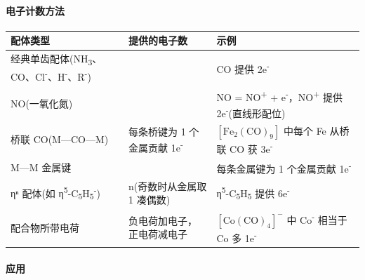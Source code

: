 \paragraph{电子计数方法}\label{ux7535ux5b50ux8ba1ux6570ux65b9ux6cd5}

{\def\LTcaptype{none} %
\begin{longtable}[]{@{}
  >{\raggedright\arraybackslash}p{}
  >{\centering\arraybackslash}p{}
  >{\raggedright\arraybackslash}p{}@{}}
\toprule\noalign{}
\begin{minipage}[b]{\linewidth}\raggedright
配体类型
\end{minipage} & \begin{minipage}[b]{\linewidth}\centering
提供的电子数
\end{minipage} & \begin{minipage}[b]{\linewidth}\raggedright
示例
\end{minipage} \\
\midrule\noalign{}
\endhead
\bottomrule\noalign{}
\endlastfoot
经典单齿配体(NH\textsubscript{3}、CO、Cl\textsuperscript{-}、H\textsuperscript{-}、R\textsuperscript{-}) & 2 & CO 提供 2e\textsuperscript{-} \\
NO(一氧化氮) & 3 & NO = NO\textsuperscript{+} + e\textsuperscript{-}，NO\textsuperscript{+} 提供 2e\textsuperscript{-}(直线形配位) \\
桥联 CO(M---CO---M) & 每条桥键为 1 个金属贡献 1e\textsuperscript{-} & \([\mathrm{Fe_2(CO)_9}]\) 中每个 Fe 从桥联 CO 获 3e\textsuperscript{-} \\
M---M 金属键 & 1 & 每条金属键为 1 个金属贡献 1e\textsuperscript{-} \\
ηⁿ 配体(如 η\textsuperscript{5}-C\textsubscript{5}H\textsubscript{5}\textsuperscript{-}) & n(奇数时从金属取 1 凑偶数) & η\textsuperscript{5}-C\textsubscript{5}H\textsubscript{5} 提供 6e\textsuperscript{-} \\
配合物所带电荷 & 负电荷加电子，正电荷减电子 & \([\mathrm{Co(CO)_4}]^-\) 中 Co\textsuperscript{-} 相当于 Co 多 1e\textsuperscript{-} \\
\end{longtable}
}

\paragraph{应用}\label{ux5e94ux7528}

